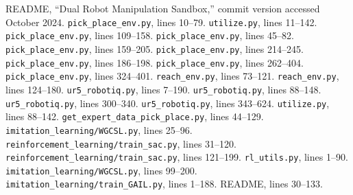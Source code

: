 \documentclass[11pt]{article}
\begin{document}
\begin{thebibliography}{9}
 README, ``Dual Robot Manipulation Sandbox,'' commit version accessed October 2024.
 \texttt{pick\_place\_env.py}, lines 10--79.
 \texttt{utilize.py}, lines 11--142.
 \texttt{pick\_place\_env.py}, lines 109--158.
 \texttt{pick\_place\_env.py}, lines 45--82.
 \texttt{pick\_place\_env.py}, lines 159--205.
 \texttt{pick\_place\_env.py}, lines 214--245.
 \texttt{pick\_place\_env.py}, lines 186--198.
 \texttt{pick\_place\_env.py}, lines 262--404.
 \texttt{pick\_place\_env.py}, lines 324--401.
 \texttt{reach\_env.py}, lines 73--121.
 \texttt{reach\_env.py}, lines 124--180.
 \texttt{ur5\_robotiq.py}, lines 7--190.
 \texttt{ur5\_robotiq.py}, lines 88--148.
 \texttt{ur5\_robotiq.py}, lines 300--340.
 \texttt{ur5\_robotiq.py}, lines 343--624.
 \texttt{utilize.py}, lines 88--142.
 \texttt{get\_expert\_data\_pick\_place.py}, lines 44--129.
 \texttt{imitation\_learning/WGCSL.py}, lines 25--96.
 \texttt{reinforcement\_learning/train\_sac.py}, lines 31--120.
 \texttt{reinforcement\_learning/train\_sac.py}, lines 121--199.
 \texttt{rl\_utils.py}, lines 1--90.
 \texttt{imitation\_learning/WGCSL.py}, lines 99--200.
 \texttt{imitation\_learning/train\_GAIL.py}, lines 1--188.
 README, lines 30--133.
\end{thebibliography}
\end{document}

